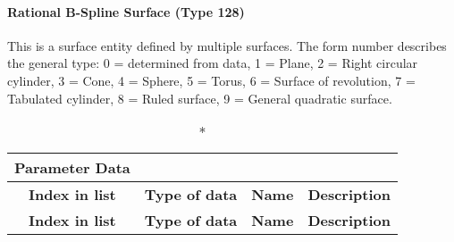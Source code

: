 \paragraph{Rational B-Spline Surface (Type
128)}\label{rational-b-spline-surface-type-128}

This is a surface entity defined by multiple surfaces. The form number
describes the general type: 0 = determined from data, 1 = Plane, 2 = Right
circular cylinder, 3 = Cone, 4 = Sphere, 5 = Torus, 6 = Surface of revolution,
7 = Tabulated cylinder, 8 = Ruled surface, 9 = General quadratic surface.


\begin{longtable}[H]{|c|c|c|l|}
  \caption*{Parameter Data} \\

  \hline
  \multicolumn{1}{|c|}{\textbf{Index in list}} & \multicolumn{1}{|c|}{\textbf{Type of data}} &
  \multicolumn{1}{|c|}{\textbf{Name}} & \multicolumn{1}{|c|}{\textbf{Description}} \\ \hline
  \endfirsthead
  \hline
  \multicolumn{1}{|c|}{\textbf{Index in list}} & \multicolumn{1}{|c|}{\textbf{Type of data}} &
  \multicolumn{1}{|c|}{\textbf{Name}} & \multicolumn{1}{|c|}{\textbf{Description}} \\ \hline
  \endhead
  

\end{longtable}
